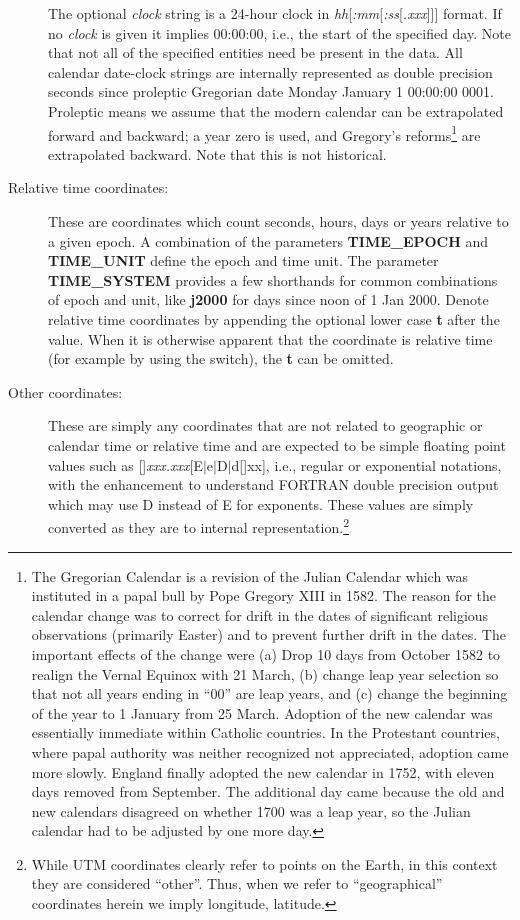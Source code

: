 \begin{description}
The optional \emph{clock} string is a 24-hour clock in \emph{hh}[\emph{:mm}[\emph{:ss}[\emph{.xxx}]]] format.
If no \emph{clock} is given
it implies 00:00:00, i.e., the start of the specified day.
Note that not all of the specified entities need be present in the data.  All calendar date-clock strings are internally represented as double precision seconds since
proleptic Gregorian date Monday January 1 00:00:00 0001.  Proleptic means we assume that the modern calendar
can be extrapolated forward and backward; a year zero is used, and Gregory's reforms\footnote{The Gregorian Calendar
is a revision of the Julian Calendar which was instituted in a papal bull by Pope Gregory XIII in 1582. The reason for the calendar
change was to correct for drift in the dates of significant religious observations (primarily Easter) and to prevent further drift
in the dates. The important effects of the change were (a) Drop 10 days from October 1582 to realign the Vernal Equinox with 21 March,
(b) change leap year selection so that not all years ending in ``00'' are leap years, and (c) change the beginning of the year to
1 January from 25 March.  Adoption of the new calendar was essentially immediate within Catholic countries. In the Protestant countries,
where papal authority was neither recognized not appreciated, adoption came more slowly. 
England finally adopted the new calendar in 1752, with eleven days removed from September. The additional day came because the old and
new calendars disagreed on whether 1700 was a leap year, so the Julian calendar had to be adjusted by one more day.} are extrapolated
backward.  Note that this is not historical.

\item [Relative time coordinates:]  These are coordinates which count seconds, hours, days or years relative to a
given epoch. A combination of the parameters \textbf{TIME\_EPOCH} and
\textbf{TIME\_UNIT} define the epoch and time unit. The parameter \textbf{TIME\_SYSTEM} provides a few shorthands for common combinations
of epoch and unit, like \textbf{j2000} for days since noon of 1 Jan 2000.
Denote relative time coordinates by appending the optional lower case
\textbf{t} after the value.  When it is otherwise apparent that the coordinate is relative time (for example by using
the  switch), the \textbf{t} can be omitted.

\item [Other coordinates:]  These are simply any coordinates that are not related to geographic or calendar time or relative
time and are
expected to be simple floating point values such as [\PM]\emph{xxx.xxx}[E$|$e$|$D$|$d[\PM]xx], i.e., regular or exponential
notations, with the enhancement to understand FORTRAN double precision output which may use D instead of E for exponents.
These values are simply converted as they are to internal representation.\footnote{While
UTM coordinates clearly refer to points on the Earth, in this context they are considered ``other''.  Thus, when we
refer to ``geographical'' coordinates herein we imply longitude, latitude.}
\end{description}


